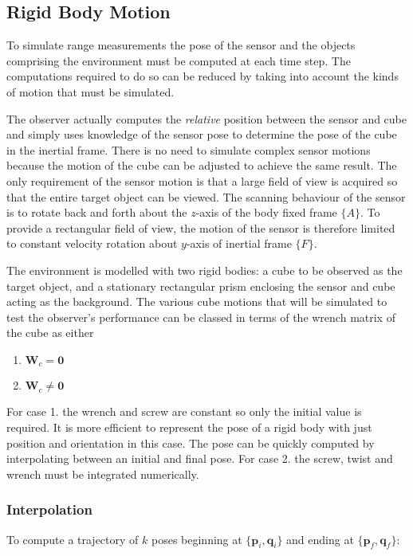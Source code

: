 \subsection{Rigid Body Motion}
To simulate range measurements the pose of the sensor and the objects comprising the environment must be computed at each time step. The computations required to do so can be reduced by taking into account the kinds of motion that must be simulated.

The observer actually computes the \textit{relative} position between the sensor and cube and simply uses knowledge of the sensor pose to determine the pose of the cube in the inertial frame. There is no need to simulate complex sensor motions because the motion of the cube can be adjusted to achieve the same result. The only requirement of the sensor motion is that a large field of view is acquired so that the entire target object can be viewed. The scanning behaviour of the sensor is to rotate back and forth about the $z$-axis of the body fixed frame $\{A\}$. To provide a rectangular field of view, the motion of the sensor is therefore limited to constant velocity rotation about $y$-axis of inertial frame $\{F\}$.

The environment is modelled with two rigid bodies: a cube to be observed as the target object, and a stationary rectangular prism enclosing the sensor and cube acting as the background. The various cube motions that will be simulated to test the observer's performance can be classed in terms of the wrench matrix of the cube as either
\begin{enumerate}
\item ${\textbf{W}_c} = \textbf{0}$
\item ${\textbf{W}_c} \neq \textbf{0}$
\end{enumerate}

For case 1. the wrench and screw are constant so only the initial value is required. It is more efficient to represent the pose of a rigid body with just position and orientation in this case. The pose can be quickly computed by interpolating between an initial and final pose. For case 2. the screw, twist and wrench must be integrated numerically.

\subsubsection{Interpolation}
To compute a trajectory of $k$ poses beginning at $\{\mathbf{p}_i,\mathbf{q}_i\}$ and ending at $\{\mathbf{p}_f,\mathbf{q}_f\}$:

